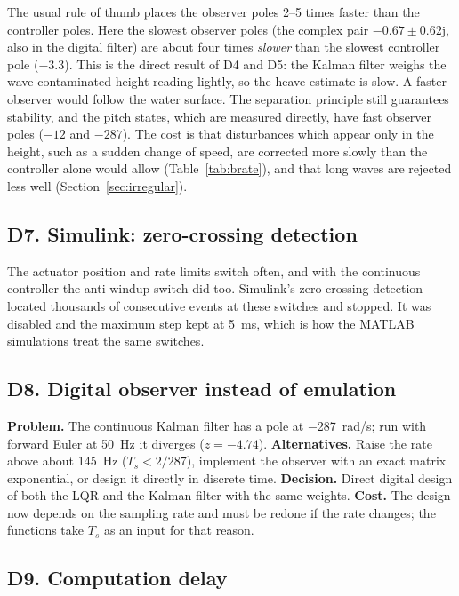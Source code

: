 \documentclass[11pt,a4paper]{article}
\begin{document}
The usual rule of thumb places the observer poles 2--5 times faster than the
controller poles. Here the slowest observer poles (the complex pair
$-0.67\pm0.62\mathrm{j}$, also in the digital filter) are about four times
\emph{slower} than the slowest controller pole ($-3.3$). This is the direct
result of D4 and D5: the Kalman filter weighs the wave-contaminated height
reading lightly, so the heave estimate is slow. A faster observer would follow
the water surface. The separation principle still guarantees stability, and the
pitch states, which are measured directly, have fast observer poles ($-12$ and
$-287$). The cost is that disturbances which appear only in the height, such as
a sudden change of speed, are corrected more slowly than the controller alone
would allow (Table~\ref{tab:brate}), and that long waves are rejected less well
(Section~\ref{sec:irregular}).

\subsection{D7. Simulink: zero-crossing detection}

The actuator position and rate limits switch often, and with the continuous
controller the anti-windup switch did too. Simulink's zero-crossing detection
located thousands of consecutive events at these switches and stopped. It was
disabled and the maximum step kept at \SI{5}{ms}, which is how the MATLAB
simulations treat the same switches.

\subsection{D8. Digital observer instead of emulation}

\textbf{Problem.} The continuous Kalman filter has a pole at \SI{-287}{rad/s};
run with forward Euler at \SI{50}{Hz} it diverges ($z=-4.74$).
\textbf{Alternatives.} Raise the rate above about \SI{145}{Hz} ($T_s<2/287$),
implement the observer with an exact matrix exponential, or design
it directly in discrete time. \textbf{Decision.} Direct digital design of both
the LQR and the Kalman filter with the same weights. \textbf{Cost.} The design
now depends on the sampling rate and must be redone if the rate changes; the
functions take $T_s$ as an input for that reason.

\subsection{D9. Computation delay}
\end{document}
